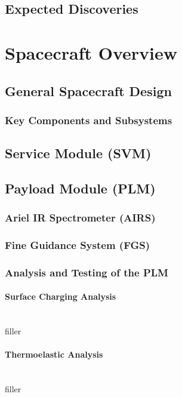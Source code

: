 \documentclass[12pt]{article}
\begin{document}
\subsection{Expected Discoveries}



\newpage

\section{Spacecraft Overview}

\subsection{General Spacecraft Design}


\subsubsection{Key Components and Subsystems}


\subsection{Service Module (SVM)}


\subsection{Payload Module (PLM)}

\subsubsection{Ariel IR Spectrometer (AIRS)} 

\subsubsection{Fine Guidance System (FGS)}

\subsubsection{Analysis and Testing of the PLM}

\paragraph{Surface Charging Analysis} ~\\
filler

\paragraph{Thermoelastic Analysis} ~\\
filler
\end{document}
